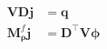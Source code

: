 \begin{equation}
    \begin{split}
        \mathbf{V} \mathbf{D}  \mathbf{j} &= \mathbf{q} \\
        \mathbf{M}_{\boldsymbol{\rho}}^f \mathbf{j} &= \mathbf{D}^\top \mathbf{V} \boldsymbol{\phi}
    \end{split}
    \label{eq:DiscreteDCCC}
\end{equation}
